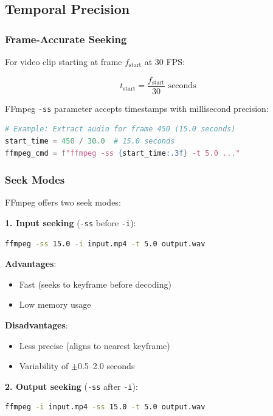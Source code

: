 \documentclass[11pt,a4paper]{article}
\begin{document}
\subsection{Temporal Precision}

\subsubsection{Frame-Accurate Seeking}

For video clip starting at frame $f_{\text{start}}$ at 30 FPS:

\begin{equation}
t_{\text{start}} = \frac{f_{\text{start}}}{30} \text{ seconds}
\end{equation}

FFmpeg \texttt{-ss} parameter accepts timestamps with millisecond precision:

\begin{lstlisting}[language=Python]
# Example: Extract audio for frame 450 (15.0 seconds)
start_time = 450 / 30.0  # 15.0 seconds
ffmpeg_cmd = f"ffmpeg -ss {start_time:.3f} -t 5.0 ..."
\end{lstlisting}

\subsubsection{Seek Modes}

FFmpeg offers two seek modes:

\textbf{1. Input seeking} (\texttt{-ss} before \texttt{-i}):
\begin{lstlisting}[language=Bash]
ffmpeg -ss 15.0 -i input.mp4 -t 5.0 output.wav
\end{lstlisting}

\textbf{Advantages}:
\begin{itemize}
    \item Fast (seeks to keyframe before decoding)
    \item Low memory usage
\end{itemize}

\textbf{Disadvantages}:
\begin{itemize}
    \item Less precise (aligns to nearest keyframe)
    \item Variability of $\pm$0.5--2.0 seconds
\end{itemize}

\textbf{2. Output seeking} (\texttt{-ss} after \texttt{-i}):
\begin{lstlisting}[language=Bash]
ffmpeg -i input.mp4 -ss 15.0 -t 5.0 output.wav
\end{lstlisting}
\end{document}
